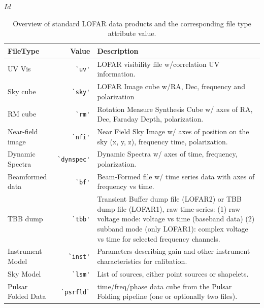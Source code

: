 \svnInfo $Id$

\begin{table}[ht]
  \centering
  \begin{tabular}{|lrp{9cm}|}
    \hline
    \sc \textbf{FileType} & \sc \textbf{Value} & \textbf{Description} \\
    \hline \hline
    UV Vis   & \verb|`uv'|  & LOFAR visibility file w/correlation UV information. \\
    Sky cube & \verb|`sky'| & LOFAR Image cube w/RA, Dec, frequency and polarization \\
    RM cube  & \verb|`rm'|  & Rotation Measure Synthesis Cube w/ axes
    of RA, Dec, Faraday Depth, polarization. \\
    Near-field image & \verb|`nfi'| & Near Field Sky Image w/ axes of
    position on the sky (x, y, z), frequency time, polarization. \\
    Dynamic Spectra  & \verb|`dynspec'|& Dynamic Spectra w/ axes of
    time, frequency, polarization. \\
    Beamformed data  & \verb|`bf'| & Beam-Formed file w/ time series
    data with axes of frequency vs time. \\
    TBB dump & \verb|`tbb'| & Transient Buffer dump file (LOFAR2) or TBB dump file (LOFAR1), raw time-series: (1) raw voltage mode: voltage vs time (baseband data) (2) subband mode (only LOFAR1): complex voltage vs time for selected frequency channels. \\
    Instrument Model & \verb|`inst'| & Parameters describing gain and other instrument characteristics for calibation. \\
    Sky Model & \verb|`lsm'| & List of sources, either point sources or shapelets. \\
    Pulsar Folded Data & \verb|`psrfld`| & time/freq/phase data cube from the Pulsar Folding pipeline (one or optionally two files). \\
    \hline
  \end{tabular}
  \caption[Overview of standard LOFAR data products]{Overview of standard LOFAR data products and the
    corresponding file type attribute value.}
  \label{tab:file-type}
\end{table}
